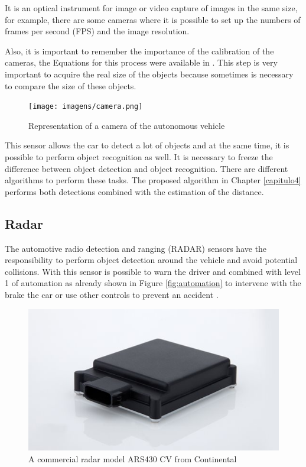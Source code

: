 It is an optical instrument for image or video capture of images in the same size, for example, there are some cameras where it is possible to set up the numbers of frames per second (FPS) and the image resolution. 

Also, it is important to remember the importance of the calibration of the cameras, the Equations for this process were available in \cite{888718}. This step is very important to acquire the real size of the objects because sometimes is necessary to compare the size of these objects. 

\begin{figure}[H]
\centering
\texttt{[image: imagens/camera.png]}
\caption{Representation of a camera of the autonomous vehicle}
\label{fig:camera}
\end{figure}

This sensor allows the car to detect a lot of objects and at the same time, it is possible to perform object recognition as well. It is necessary to freeze the difference between object detection and object recognition. There are different algorithms to perform these tasks. The proposed algorithm in Chapter \ref{capitulo4} performs both detections combined with the estimation of the distance. 

\subsection{Radar}

The automotive radio detection and ranging (RADAR) sensors have the responsibility to perform object detection around the vehicle and avoid potential collisions. With this sensor is possible to warn the driver and combined with level 1 of automation as already shown in Figure \ref{fig:automation} to intervene with the brake the car or use other controls to prevent an accident \cite{ariyur2006collision}.

\begin{figure}[H]
\centering
\includegraphics[width=\columnwidth]{imagens/radar.jpg}
\caption{A commercial radar model ARS430 CV from Continental}
\label{fig:camera}
\end{figure}

